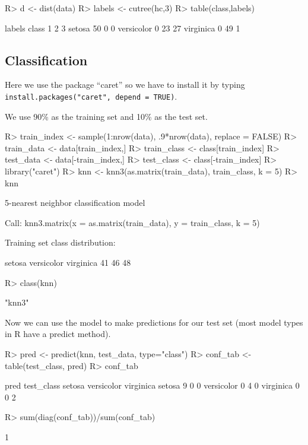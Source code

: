 \documentclass[fleqn, letter, 10pt]{article}
\begin{document}
\begin{Schunk}
\begin{Sinput}
R> d <- dist(data)
R> labels <- cutree(hc,3)
R> table(class,labels)
\end{Sinput}
\begin{Soutput}
            labels
class         1  2  3
  setosa     50  0  0
  versicolor  0 23 27
  virginica   0 49  1
\end{Soutput}
\end{Schunk}

\subsection{Classification}

Here we use the package ``caret'' so we have to install it by typing
\verb|install.packages("caret", depend = TRUE)|.

We use 90\% as the training set and 10\% as the test set.
\begin{Schunk}
\begin{Sinput}
R> train_index <- sample(1:nrow(data), .9*nrow(data), replace = FALSE)
R> train_data <- data[train_index,]
R> train_class <- class[train_index]
R> test_data <- data[-train_index,]
R> test_class <- class[-train_index]
R> library("caret")
R> knn <- knn3(as.matrix(train_data), train_class, k = 5)
R> knn
\end{Sinput}
\begin{Soutput}
5-nearest neighbor classification model

Call:
knn3.matrix(x = as.matrix(train_data), y = train_class, k = 5)

Training set class distribution:

    setosa versicolor  virginica 
        41         46         48 
\end{Soutput}
\begin{Sinput}
R> class(knn)
\end{Sinput}
\begin{Soutput}
[1] "knn3"
\end{Soutput}
\end{Schunk}

Now we can use the model to make predictions for our test set (most model
types in R have a predict method).

\begin{Schunk}
\begin{Sinput}
R> pred <- predict(knn, test_data, type="class")
R> conf_tab <- table(test_class, pred)
R> conf_tab
\end{Sinput}
\begin{Soutput}
            pred
test_class   setosa versicolor virginica
  setosa          9          0         0
  versicolor      0          4         0
  virginica       0          0         2
\end{Soutput}
\begin{Sinput}
R> sum(diag(conf_tab))/sum(conf_tab)
\end{Sinput}
\begin{Soutput}
[1] 1
\end{Soutput}
\end{Schunk}
\end{document}
